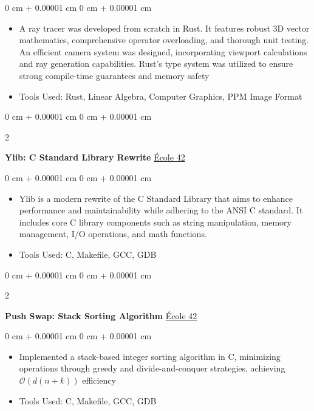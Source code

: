 \documentclass[10pt, letterpaper]{article}
\newenvironment{highlights}{
    \begin{itemize}[
        topsep=0.10 cm,
        parsep=0.10 cm,
        partopsep=0pt,
        itemsep=0pt,
        leftmargin=0 cm + 10pt
    ]
}{
    \end{itemize}
} %
\newenvironment{onecolentry}{
    \begin{adjustwidth}{
        0 cm + 0.00001 cm
    }{
        0 cm + 0.00001 cm
    }
}{
    \end{adjustwidth}
} %
\newenvironment{twocolentry}[2][]{
    \onecolentry
    \def\secondColumn{#2}
    \setcolumnwidth{\fill, 4.5 cm}
    \begin{paracol}{2}
}{
    \switchcolumn \raggedleft \secondColumn
    \end{paracol}
    \endonecolentry
} %
\begin{document}
        \vspace{0.10 cm}
        \begin{onecolentry}
            \begin{highlights}
                \item A ray tracer was developed from scratch in Rust. It features robust 3D vector mathematics, comprehensive operator overloading, and thorough unit testing. An efficient camera system was designed, incorporating viewport calculations and ray generation capabilities. Rust's type system was utilized to ensure strong compile-time guarantees and memory safety
                \item Tools Used: Rust, Linear Algebra, Computer Graphics, PPM Image Format
            \end{highlights}
        \end{onecolentry}

        \vspace{0.2 cm}

        \begin{twocolentry}{
            \href{https://github.com/yuann3/Ylib}{École 42}
        }
            \textbf{Ylib: C Standard Library Rewrite}\end{twocolentry}

        \vspace{0.10 cm}
        \begin{onecolentry}
            \begin{highlights}
                \item Ylib is a modern rewrite of the C Standard Library that aims to enhance performance and maintainability while adhering to the ANSI C standard. It includes core C library components such as string manipulation, memory management, I/O operations, and math functions.
                \item Tools Used: C, Makefile, GCC, GDB
            \end{highlights}
        \end{onecolentry}

        \vspace{0.2 cm}

        \begin{twocolentry}{
            \href{https://github.com/yuann3/push_swap}{École 42}
        }
            \textbf{Push Swap: Stack Sorting Algorithm}\end{twocolentry}

        \vspace{0.10 cm}
        \begin{onecolentry}
            \begin{highlights}
                \item Implemented a stack-based integer sorting algorithm in C, minimizing operations through greedy and divide-and-conquer strategies, achieving $\mathcal{O}(d(n + k))$ efficiency
                \item Tools Used: C, Makefile, GCC, GDB
            \end{highlights}
        \end{onecolentry}


    
\end{document}
